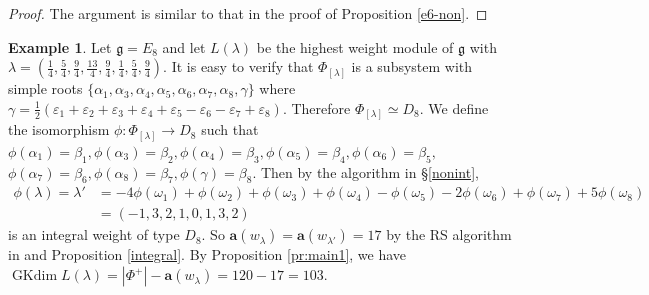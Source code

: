 \documentclass[reqno,12pt]{amsart}
\numberwithin{equation}{section}
\theoremstyle{plain}
\theoremstyle{definition}
\newtheorem{ex}[Thm]{Example}
\newcommand{\lam}{\lambda}
\newcommand{\ep}{\varepsilon}
\newcommand{\aff}{ \mathbf{a} }
\newcommand{\gkd}{\operatorname{GKdim}}
\newcommand{\lest}{\leqslant}
\begin{document}
\begin{proof}
The argument is similar to that in the proof of Proposition \ref{e6-non}.


\end{proof}
\begin{ex}
	Let $\mathfrak{g}=E_8$ and let $L(\lam)$ be the highest weight module of $\mathfrak{g}$ with  $\lambda=(\frac{1}{4},\frac{5}{4},\frac{9}{4},\frac{13}{4},\frac{9}{4},\frac{1}{4},
 \frac{5}{4},\frac{9}{4}).$ It is easy to verify that $\Phi_{[\lambda]}$ is a subsystem with simple roots $\{\alpha_1,\alpha_3,\alpha_4,\alpha_5,\alpha_6,\alpha_7,\alpha_8,\gamma\}$ where $\gamma=\frac{1}{2}(\ep_1+\ep_2+\ep_3+\ep_4+\ep_5-\ep_6-\ep_7+\ep_8)$. Therefore $\Phi_{[\lambda]}\simeq D_8$.  We define the isomorphism  $\phi:  \Phi_{[\lambda]} \rightarrow D_8$ such that $\phi(\alpha_1)=\beta_1, \phi(\alpha_3)=\beta_2, \phi(\alpha_4)=\beta_3, \phi(\alpha_5)=\beta_4,\phi(\alpha_6)=\beta_5,$
$\phi(\alpha_7)=\beta_6,\phi(\alpha_8)=\beta_7,\phi(\gamma)=\beta_8$.
Then  by the algorithm in \S \ref{nonint}, 
\begin{align*}
           \phi(\lam)=\lambda'&=-4\phi(\omega_1)+\phi(\omega_2)+\phi(\omega_3)+\phi(\omega_4)-\phi(\omega_5)-2\phi(\omega_6)+\phi(\omega_7)+5\phi(\omega_8)\\
           &=(-1,3,2,1,0,1,3,2)
        \end{align*} is an integral weight of type $D_8$.
  So $\aff(w_{\lambda})=\aff(w_{\lambda'})=17$ by the RS algorithm in \cite{BXX} and Proposition \ref{integral}.
 By Proposition \ref{pr:main1},  we have $\gkd L(\lambda)=|\Phi^+|-\aff(w_{\lambda})=120-17=103$.
\end{ex}
\end{document}
